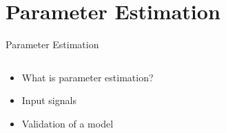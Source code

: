 \documentclass[11pt,aspectratio=169]{beamer}
\begin{document}
\section{Parameter Estimation}
\begin{frame}{Parameter Estimation}
\begin{columns}
\begin{column}{0.5\textwidth}
\begin{itemize}
\item {} {What is parameter estimation?}
\item {} {Input signals}
\item {} {Validation of a model}
\end{itemize}
\end{column}
\begin{column}{0.5\textwidth}




\end{column}
\end{columns}
\end{frame}
\end{document}
